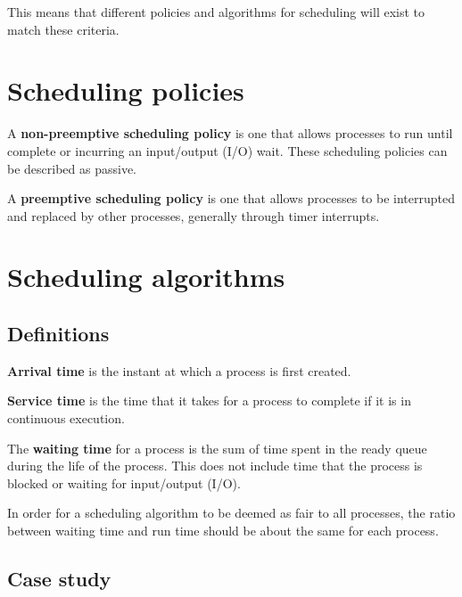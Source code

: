 \documentclass[a4paper]{systems-software}
\begin{document}
This means that different policies and algorithms for scheduling will exist to match these criteria.


\section*{Scheduling policies}

A \textbf{non-preemptive scheduling policy} is one that allows processes to run until complete or incurring an input/output (I/O) wait. These scheduling policies can be described as passive.

A \textbf{preemptive scheduling policy} is one that allows processes to be interrupted and replaced by other processes, generally through timer interrupts.


\section*{Scheduling algorithms}

\subsection*{Definitions}

\textbf{Arrival time} is the instant at which a process is first created.

\textbf{Service time} is the time that it takes for a process to complete if it is in continuous execution.

The \textbf{waiting time} for a process is the sum of time spent in the ready queue during the life of the process. This does not include time that the process is blocked or waiting for input/output (I/O).

In order for a scheduling algorithm to be deemed as fair to all processes, the ratio between waiting time and run time should be about the same for each process.


\subsection*{Case study}
\end{document}
